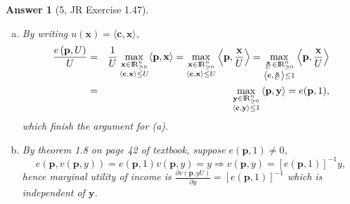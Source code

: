 \documentclass{article}
\newtheorem*{ans}{Answer}
\newcommand {\Reals}  {{\rm I \! R}}
\newcommand{\1}{{\bf 1}}
\newcommand{\0}{{\mathbf{0}}}
\renewcommand{\c}{{\mathbf{c}}}
\newcommand{\p}{{\mathbf{p}}}
\newcommand{\x}{{\mathbf{x}}}
\newcommand{\y}{{\mathbf{y}}}
\newcommand{\<}{\langle}
\renewcommand{\>}{\rangle}
\begin{document}
\begin{ans}[5, JR Exercise 1.47]
	\begin{enumerate}[(a)]
		\item By writing $u(\x) = \langle \c, \x \rangle$,
\begin{eqnarray*}
\frac{ e\left( \p ,U \right)}U & = & \frac1U   \max_{\substack{\x \in \Reals^n_{\ge 0} \\ \langle \c, \x \rangle \le U}  } \langle \p, \x \rangle  =  \max_{\substack{\x \in \Reals^n_{\ge 0} \\ \langle \c, \x \rangle \le U}  } \left\langle \p, \frac{\x}U \right\rangle  =   \max_{\substack{\frac{\x}U \in \Reals^n_{\ge 0} \\ \left\langle \c, \frac{\x}U \right\rangle \le 1 } } \left\langle \p, \frac{\x}U \right\rangle \\
&   = &  \max_{\substack{\y \in \Reals^n_{\ge 0} \\ \left\langle \c, \y \right\rangle \le 1 } } \left\langle \p, \y \right\rangle = e(\p,1),
\end{eqnarray*}
which finish the argument for (a).
\item By theorem 1.8 on page 42 of textbook, suppose $e(\p, 1) \ne 0$,
$$
e\left(\p, v(\p, y)\right) =  e(\p, 1) v(\p ,y)= y \Rightarrow v(\p ,y)= \left[ e(\p, 1) \right]^{-1} y,
$$
hence marginal utility of income is $\frac{\partial v(\p ,yU)} {\partial y} = \left[ e(\p, 1) \right]^{-1} $ which is independent of $\y$.
	\end{enumerate}
\end{ans}
\end{document}
